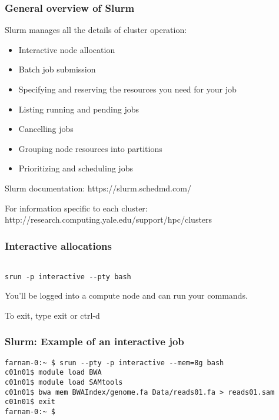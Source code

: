\documentclass[10pt]{beamer}
\begin{document}
\begin{frame}[fragile]
\frametitle{General overview of Slurm}

Slurm manages all the details of cluster operation:
\begin{itemize}
\item Interactive node allocation
\item Batch job submission
\item Specifying and reserving the resources you need for your job
\item Listing running and pending jobs
\item Cancelling jobs
\item Grouping node resources into partitions
\item Prioritizing and scheduling jobs
\end{itemize}

Slurm documentation:
https://slurm.schedmd.com/

For information specific to each cluster:
http://research.computing.yale.edu/support/hpc/clusters

\end{frame}

\begin{frame}[fragile]
\frametitle{Interactive allocations}

\begin{verbatim}

srun -p interactive --pty bash

\end{verbatim}

You'll be logged into a compute node and can run your commands. 
\vspace{0.1in}

To exit, type exit or ctrl-d

\end{frame}

\begin{frame}[fragile]
\frametitle{Slurm: Example of an interactive job}
\begin{verbatim}
farnam-0:~ $ srun --pty -p interactive --mem=8g bash
c01n01$ module load BWA
c01n01$ module load SAMtools 
c01n01$ bwa mem BWAIndex/genome.fa Data/reads01.fa > reads01.sam
c01n01$ exit
farnam-0:~ $
\end{verbatim}
\end{frame}
\end{document}

